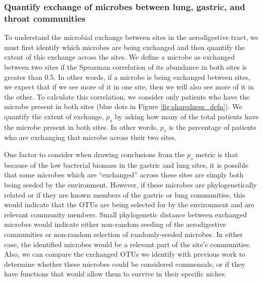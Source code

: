 \documentclass[12pt]{article}
\begin{document}
\subsubsection{Quantify exchange of microbes between lung, gastric, and throat communities} \label{sec:exchange}

To understand the microbial exchange between sites in the 
aerodigestive tract, we must first identify which microbes are being exchanged
and then quantify the extent of this exchange across the sites. 
We define a microbe as exchanged between two sites if the Spearman 
correlation of its abundance in both sites is greater than 0.5.
In other words, if a microbe is being exchanged between sites, we expect that if we see 
more of it in one site, then we will also see more of it in the other. 
To calculate this correlation, we consider only patients who have the microbe present in both sites (blue dots in Figure \ref{fig:sharedness_defn}).
We quantify the extent of exchange, $p_s$ by asking how many of the total patients
have the microbe present in both sites. In other words, $p_s$ is the 
percentage of patients who are exchanging that microbe across their two sites.

One factor to consider when drawing conclusions from the $p_s$ metric 
is that because of the low bacterial biomass in the gastric and lung 
sites, it is possible that some microbes which are ``exchanged'' across 
these sites are simply both being seeded by the environment. However, 
if these microbes are phylogenetically related or if they are known 
members of the gastric or lung communities, this would indicate that 
the OTUs are being selected for by the environment and are relevant 
community members. Small phylogenetic distance between exchanged microbes
would indicate either non-random seeding of the aerodigestive communities 
or non-random selection of randomly-seeded microbes. In either case, the
identified microbes would be a relevant part of the site's communities.
Also, we can compare the exchanged OTUs we identify with previous work
to determine whether these microbes could be considered commensals, or
if they have functions that would allow them to survive in their specific niches.
\end{document}
